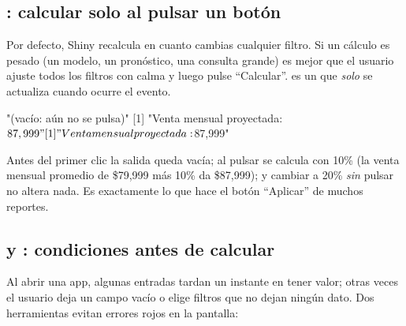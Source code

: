 \subsection{\texorpdfstring{}{eventReactive()}: calcular solo al pulsar un botón}

Por defecto, Shiny recalcula en cuanto cambias cualquier filtro. Si un
cálculo es pesado (un modelo, un pronóstico, una consulta grande) es mejor
que el usuario ajuste todos los filtros con calma y luego pulse
``Calcular''.  es un
 que \emph{solo} se actualiza cuando ocurre el evento.

\begin{rsalida}
[1] "(vacío: aún no se pulsa)"
[1] "Venta mensual proyectada: $87,999"
[1] "Venta mensual proyectada: $87,999"
\end{rsalida}

Antes del primer clic la salida queda vacía; al pulsar se calcula con 10\%
(la venta mensual promedio de \$79,999 más 10\% da \$87,999); y cambiar a
20\% \emph{sin} pulsar no altera nada. Es exactamente lo que hace el botón
``Aplicar'' de muchos reportes.

\subsection{\texorpdfstring{}{req()} y \texorpdfstring{}{validate(need())}: condiciones antes de calcular}

Al abrir una app, algunas entradas tardan un instante en tener valor; otras
veces el usuario deja un campo vacío o elige filtros que no dejan ningún
dato. Dos herramientas evitan errores rojos en la pantalla:

